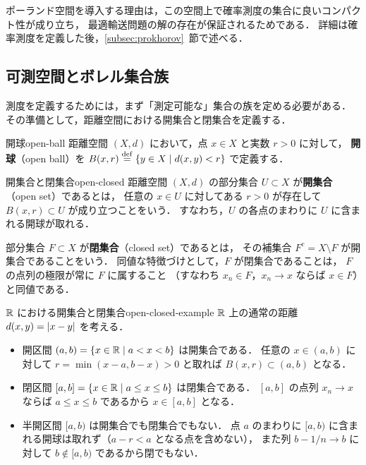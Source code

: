 ポーランド空間を導入する理由は，この空間上で確率測度の集合に良いコンパクト性が成り立ち，
最適輸送問題の解の存在が保証されるためである．
詳細は確率測度を定義した後，\ref{subsec:prokhorov}~節で述べる．

\subsection{可測空間とボレル集合族}
\label{subsec:measurable-space}

測度を定義するためには，まず「測定可能な」集合の族を定める必要がある．
その準備として，距離空間における開集合と閉集合を定義する．

\begin{definition}{開球}{open-ball}
  距離空間 $(X, d)$ において，点 $x \in X$ と実数 $r > 0$ に対して，
  \textbf{開球}（open ball）を
  $B(x, r) \overset{\mathrm{def}}{=} \{y \in X \mid d(x, y) < r\}$
  で定義する．
\end{definition}

\begin{definition}{開集合と閉集合}{open-closed}
  距離空間 $(X, d)$ の部分集合 $U \subset X$ が\textbf{開集合}（open set）であるとは，
  任意の $x \in U$ に対してある $r > 0$ が存在して
  $B(x, r) \subset U$ が成り立つことをいう．
  すなわち，$U$ の各点のまわりに $U$ に含まれる開球が取れる．

  部分集合 $F \subset X$ が\textbf{閉集合}（closed set）であるとは，
  その補集合 $F^c = X \setminus F$ が開集合であることをいう．
  同値な特徴づけとして，$F$ が閉集合であることは，
  $F$ の点列の極限が常に $F$ に属すること
  （すなわち $x_n \in F$，$x_n \to x$ ならば $x \in F$）と同値である．
\end{definition}

\begin{example}{$\mathbb{R}$ における開集合と閉集合}{open-closed-example}
  $\mathbb{R}$ 上の通常の距離 $d(x,y) = \lvert x-y \rvert$ を考える．
  \begin{itemize}
    \item 開区間 $(a, b) = \{x \in \mathbb{R} \mid a < x < b\}$ は開集合である．
      任意の $x \in (a, b)$ に対して $r = \min(x - a, b - x) > 0$ と取れば
      $B(x, r) \subset (a, b)$ となる．
    \item 閉区間 $[a, b] = \{x \in \mathbb{R} \mid a \leq x \leq b\}$ は閉集合である．
      $[a, b]$ の点列 $x_n \to x$ ならば $a \leq x \leq b$ であるから $x \in [a, b]$ となる．
    \item 半開区間 $[a, b)$ は開集合でも閉集合でもない．
      点 $a$ のまわりに $[a, b)$ に含まれる開球は取れず（$a - r < a$ となる点を含めない），
      また列 $b - 1/n \to b$ に対して $b \notin [a, b)$ であるから閉でもない．
  \end{itemize}
\end{example}

